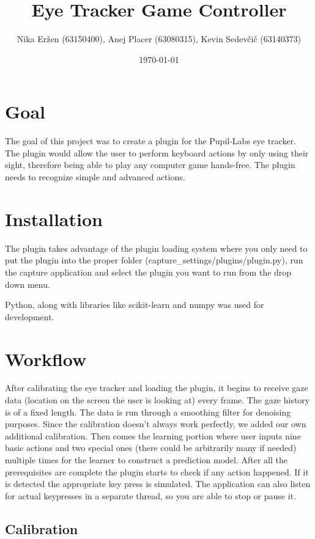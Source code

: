 \documentclass[a4paper,11pt]{article}
\title{Eye Tracker Game Controller}
\author{Nika Er\v zen (63150400), Anej Placer (63080315), Kevin Sedev\v ci\v c (63140373)}
\date{\today}
\begin{document}
\maketitle

\section{Goal}

The goal of this project was to create a plugin for the Pupil-Labs eye tracker. The plugin would allow the user to perform keyboard actions by only using their sight, therefore being able to play any computer game hands-free. The plugin needs to recognize simple and advanced actions.

\section{Installation}

The plugin takes advantage of the plugin loading system where you only need to put the plugin into the proper folder (capture\_settings/plugins/plugin.py), run the capture application and select the plugin you want to run from the drop down menu.

Python, along with libraries like scikit-learn and numpy was used for development.

\section{Workflow}

After calibrating the eye tracker and loading the plugin, it begins to receive gaze data (location on the screen the user is looking at) every frame. The gaze history is of a fixed length. The data is run through a smoothing filter for denoising purposes. Since the calibration doesn't always work perfectly, we added our own additional calibration. Then comes the learning portion where user inputs nine basic actions and two special ones (there could be arbitrarily many if needed) multiple times for the learner to construct a prediction model. After all the prerequisites are complete the plugin starts to check if any action happened. If it is detected the appropriate key press is simulated. The application can also listen for actual keypresses in a separate thread, so you are able to stop or pause it.

\subsection{Calibration}
\end{document}
